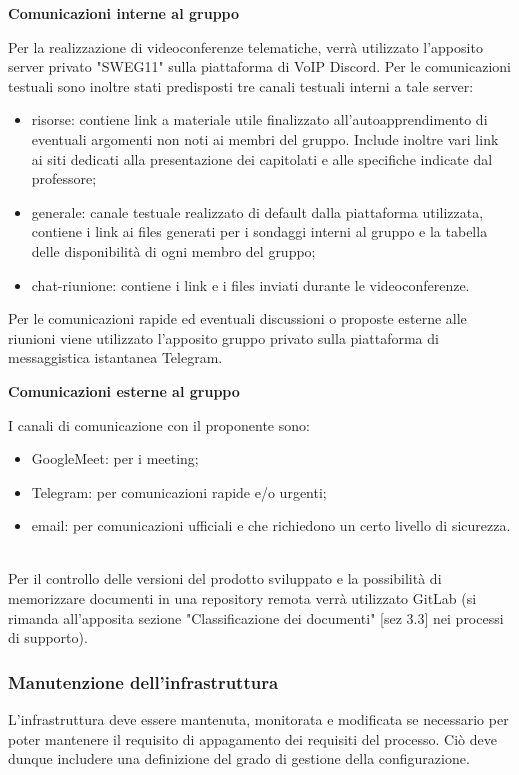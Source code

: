 \textbf{Comunicazioni interne al gruppo}

 Per la realizzazione di videoconferenze telematiche, verrà utilizzato l'apposito server privato "SWEG11" sulla piattaforma di VoIP Discord.
Per le comunicazioni testuali sono inoltre stati predisposti tre canali testuali interni a tale server:

\begin{itemize}
    \item risorse: contiene link a materiale utile finalizzato all'autoapprendimento di eventuali argomenti non noti ai membri del gruppo. Include inoltre vari link ai siti dedicati alla presentazione dei capitolati e  alle specifiche indicate dal professore;
    \item generale: canale testuale realizzato di default dalla piattaforma utilizzata, contiene i link ai files generati per i sondaggi interni al gruppo e la tabella delle disponibilità di ogni membro del gruppo;
    \item chat-riunione: contiene i link e i files inviati durante le videoconferenze.
\end{itemize}

Per le comunicazioni rapide ed eventuali discussioni o proposte esterne alle riunioni viene utilizzato l'apposito gruppo privato sulla piattaforma di messaggistica istantanea Telegram.

\textbf{Comunicazioni esterne al gruppo}

I canali di comunicazione con il proponente sono:
\begin{itemize}
    \item GoogleMeet: per i meeting; 
    \item Telegram: per comunicazioni rapide e/o urgenti;
    \item email: per comunicazioni ufficiali e che richiedono un certo livello di sicurezza.
\end{itemize}
\leavevmode \\
Per il controllo delle versioni del prodotto sviluppato e la possibilità di memorizzare documenti in una repository remota verrà utilizzato GitLab (si rimanda all'apposita sezione "Classificazione dei documenti" [sez 3.3] nei processi di supporto).

\subsubsection{Manutenzione dell'infrastruttura}
L'infrastruttura deve essere mantenuta, monitorata e modificata se necessario per poter mantenere il requisito di appagamento dei requisiti del processo. Ciò deve dunque includere una definizione del grado di gestione della configurazione.

